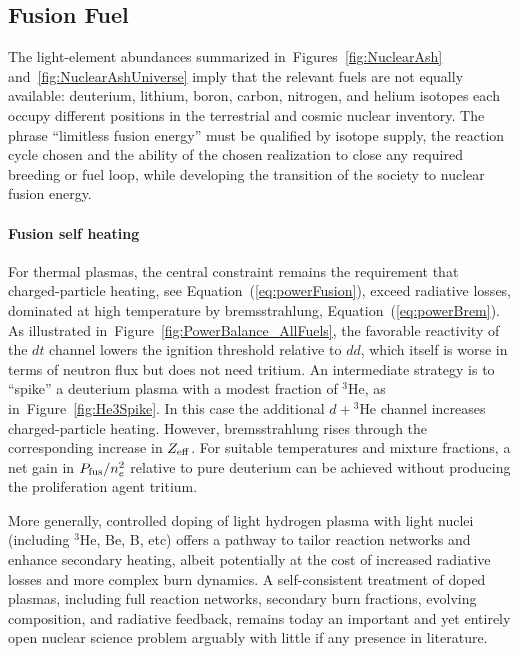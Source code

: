 \documentclass[particles,article,accept,pdftex,moreauthors]{Definitions/mdpi}
\newcommand{\req}[1]{Equation~(\ref{#1})}
\newcommand{\rf}[1]{Figure~\ref{#1}}
\begin{document}
\subsection{Fusion Fuel}
The light-element abundances summarized in~Figures~\ref{fig:NuclearAsh} and~\ref{fig:NuclearAshUniverse} imply that the relevant fuels are not equally available: deuterium, lithium, boron, carbon, nitrogen, and helium isotopes each occupy different positions in the terrestrial and cosmic nuclear inventory. The phrase ``limitless fusion energy'' must be qualified by isotope supply, the reaction cycle chosen and the ability of the chosen realization to close any required breeding or fuel loop, while developing the transition of the society to nuclear fusion energy.


\paragraph*{\bf Fusion self heating}
For thermal plasmas, the central constraint remains the requirement that charged-particle heating, see \req{eq:powerFusion}, exceed radiative losses, dominated at high temperature by bremsstrahlung, \req{eq:powerBrem}. As illustrated in~\rf{fig:PowerBalance_AllFuels}, the favorable reactivity of the $dt$ channel lowers the ignition threshold relative to $dd$, which itself is worse in terms of neutron flux but does not need tritium. An intermediate strategy is to ``spike'' a deuterium plasma with a modest fraction of ${}^3$He, as in~\rf{fig:He3Spike}. In this case the additional $d+{}^3$He channel increases charged-particle heating. However, bremsstrahlung rises through the corresponding increase in $Z_{\rm eff}$. For suitable temperatures and mixture fractions, a net gain in $P_{\rm fus}/n_e^2$ relative to pure deuterium can be achieved without producing the proliferation agent tritium.
 
More generally, controlled doping of light hydrogen plasma with light nuclei (including ${}^3$He, Be, B, etc) offers a pathway to tailor reaction networks and enhance secondary heating, albeit potentially at the cost of increased radiative losses and more complex burn dynamics. A self-consistent treatment of doped plasmas, including full reaction networks, secondary burn fractions, evolving composition, and radiative feedback, remains today an important and yet entirely open nuclear science problem arguably with little if any presence in literature.
\end{document}
